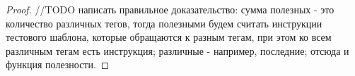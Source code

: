 \documentclass[14pt]{extreport}
\newtheorem*{sld}{Следствие}
\newcommand{\LRU}{\textsf{LRU}\xspace}
\begin{document}
\begin{proof}
//TODO написать правильное доказательство:
сумма полезных - это количество различных тегов, тогда полезными будем считать
инструкции тестового шаблона, которые обращаются к разным тегам, при этом ко
всем различным тегам есть инструкция; различные - например, последние; отсюда и
функция полезности.

\end{proof}
\end{document}
